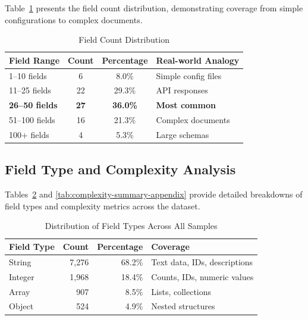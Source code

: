 \documentclass{article}
\begin{document}
Table~\ref{tab:field-count-appendix} presents the field count distribution, demonstrating coverage from simple configurations to complex documents.

\begin{table}[H]
\centering
\caption{Field Count Distribution}
\label{tab:field-count-appendix}
\begin{tabular}{lccp{4.5cm}}
\toprule
\textbf{Field Range} & \textbf{Count} & \textbf{Percentage} & \textbf{Real-world Analogy} \\
\midrule
1--10 fields & 6 & 8.0\% & Simple config files \\
11--25 fields & 22 & 29.3\% & API responses \\
\textbf{26--50 fields} & \textbf{27} & \textbf{36.0\%} & \textbf{Most common} \\
51--100 fields & 16 & 21.3\% & Complex documents \\
100+ fields & 4 & 5.3\% & Large schemas \\
\bottomrule
\end{tabular}
\end{table}

\subsection{Field Type and Complexity Analysis}
\label{subsec:field-type-analysis}

Tables~\ref{tab:field-types-appendix} and \ref{tab:complexity-summary-appendix} provide detailed breakdowns of field types and complexity metrics across the dataset.

\begin{table}[H]
\centering
\caption{Distribution of Field Types Across All Samples}
\label{tab:field-types-appendix}
\begin{tabular}{lrrp{5.5cm}}
\toprule
\textbf{Field Type} & \textbf{Count} & \textbf{Percentage} & \textbf{Coverage} \\
\midrule
String & 7,276 & 68.2\% & Text data, IDs, descriptions \\
Integer & 1,968 & 18.4\% & Counts, IDs, numeric values \\
Array & 907 & 8.5\% & Lists, collections \\
Object & 524 & 4.9\% & Nested structures \\
\bottomrule
\end{tabular}
\end{table}
\end{document}
